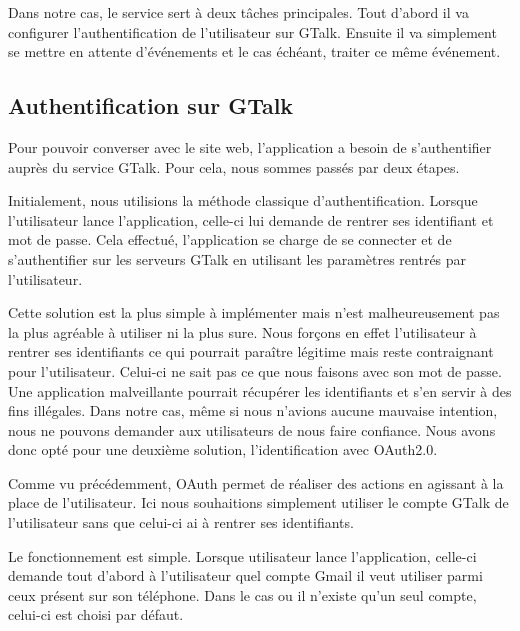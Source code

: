 Dans notre cas, le service sert à deux tâches principales. Tout d'abord il va configurer l'authentification
de l'utilisateur sur GTalk. Ensuite il va simplement se mettre en attente d'événements et le cas échéant, 
traiter ce même événement.
\\
 
 
 
\subsection{Authentification sur GTalk}

Pour pouvoir converser avec le site web, l'application a besoin de s'authentifier auprès du service
GTalk. Pour cela, nous sommes passés par deux étapes. 
 
Initialement, nous utilisions la méthode classique d'authentification. Lorsque l'utilisateur lance 
l'application, celle-ci lui demande de rentrer ses identifiant et mot de passe. Cela effectué, 
l'application se charge de se connecter et de s'authentifier sur les serveurs GTalk en utilisant les
paramètres rentrés par l'utilisateur.
 
Cette solution est la plus simple à implémenter mais n'est malheureusement pas la plus agréable
à utiliser ni la plus sure. Nous forçons en effet l'utilisateur à rentrer ses identifiants ce qui 
pourrait paraître légitime mais reste contraignant pour l'utilisateur. Celui-ci ne sait pas ce que 
nous faisons avec son mot de passe. Une application malveillante pourrait récupérer les identifiants
et s'en servir à des fins illégales. Dans notre cas, même si nous n'avions aucune mauvaise intention,
nous ne pouvons demander aux utilisateurs de nous faire confiance. Nous avons donc opté pour une 
deuxième solution, l'identification avec OAuth2.0.
 
Comme vu précédemment, OAuth permet de réaliser des actions en agissant à la place de l'utilisateur. 
Ici nous souhaitions simplement utiliser le compte GTalk de l'utilisateur sans que celui-ci ai à rentrer
ses identifiants. 
 
Le fonctionnement est simple. Lorsque utilisateur lance l'application, celle-ci demande tout d'abord
à l'utilisateur quel compte Gmail il veut utiliser parmi ceux présent sur son téléphone. Dans le cas
ou il n'existe qu'un seul compte, celui-ci est choisi par défaut.
\\
 
